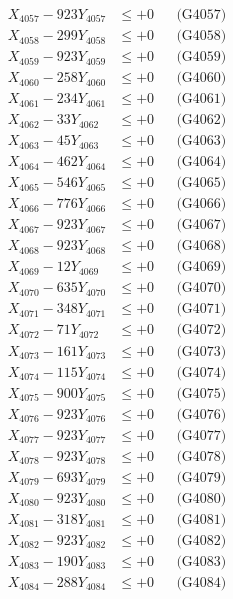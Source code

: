 \documentclass[a4paper,10pt]{article}
\begin{document}
{\begin{align}
X_{4057} - 923Y_{4057} &\leq +0 && \text{(G4057)} \\
X_{4058} - 299Y_{4058} &\leq +0 && \text{(G4058)} \\
X_{4059} - 923Y_{4059} &\leq +0 && \text{(G4059)} \\
X_{4060} - 258Y_{4060} &\leq +0 && \text{(G4060)} \\
\allowbreak
X_{4061} - 234Y_{4061} &\leq +0 && \text{(G4061)} \\
X_{4062} - 33Y_{4062} &\leq +0 && \text{(G4062)} \\
X_{4063} - 45Y_{4063} &\leq +0 && \text{(G4063)} \\
X_{4064} - 462Y_{4064} &\leq +0 && \text{(G4064)} \\
X_{4065} - 546Y_{4065} &\leq +0 && \text{(G4065)} \\
X_{4066} - 776Y_{4066} &\leq +0 && \text{(G4066)} \\
X_{4067} - 923Y_{4067} &\leq +0 && \text{(G4067)} \\
X_{4068} - 923Y_{4068} &\leq +0 && \text{(G4068)} \\
X_{4069} - 12Y_{4069} &\leq +0 && \text{(G4069)} \\
X_{4070} - 635Y_{4070} &\leq +0 && \text{(G4070)} \\
\allowbreak
X_{4071} - 348Y_{4071} &\leq +0 && \text{(G4071)} \\
X_{4072} - 71Y_{4072} &\leq +0 && \text{(G4072)} \\
X_{4073} - 161Y_{4073} &\leq +0 && \text{(G4073)} \\
X_{4074} - 115Y_{4074} &\leq +0 && \text{(G4074)} \\
X_{4075} - 900Y_{4075} &\leq +0 && \text{(G4075)} \\
X_{4076} - 923Y_{4076} &\leq +0 && \text{(G4076)} \\
X_{4077} - 923Y_{4077} &\leq +0 && \text{(G4077)} \\
X_{4078} - 923Y_{4078} &\leq +0 && \text{(G4078)} \\
X_{4079} - 693Y_{4079} &\leq +0 && \text{(G4079)} \\
X_{4080} - 923Y_{4080} &\leq +0 && \text{(G4080)} \\
\allowbreak
X_{4081} - 318Y_{4081} &\leq +0 && \text{(G4081)} \\
X_{4082} - 923Y_{4082} &\leq +0 && \text{(G4082)} \\
X_{4083} - 190Y_{4083} &\leq +0 && \text{(G4083)} \\
X_{4084} - 288Y_{4084} &\leq +0 && \text{(G4084)} \\

\end{align}}
\end{document}
